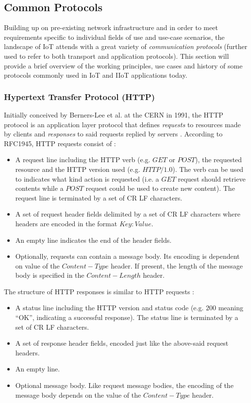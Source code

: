 \subsection{Common Protocols}
\label{sec:iot-common-protocols}
Building up on pre-existing network infrastructure and in order to meet requirements specific to individual fields of use and use-case scenarios, the landscape of \ac{IoT} attends with a great variety of \emph{communication protocols} (further used to refer to both transport and application protocols). This section will provide a brief overview of the working principles, use cases and history of some protocols commonly used in \ac{IoT} and \ac{IIoT} applications today.
\subsubsection{Hypertext Transfer Protocol (\ac{HTTP})}
Initially conceived by Berners-Lee et al. at the \ac{CERN} in 1991, the \ac{HTTP} protocol is an application layer protocol that defines \emph{requests} to resources made by clients and \emph{responses} to said requests replied by servers \cite{http1991}. According to RFC1945, \ac{HTTP} requests consist of \cite{rfc1945}:
\begin{itemize}
    \item A request line including the \ac{HTTP} verb (e.g. $GET$ or $POST$), the requested resource and the \ac{HTTP} version used (e.g. $HTTP/1.0$). The verb can be used to indicates what kind action is requested (i.e. a $GET$ request should retrieve contents while a $POST$ request could be used to create new content). The request line is terminated by a set of \ac{CR} \ac{LF} characters.
    \item A set of request header fields delimited by a set of \ac{CR} \ac{LF} characters where headers are encoded in the format $Key: Value$.
    \item An empty line indicates the end of the header fields.
    \item Optionally, requests can contain a message body. Its encoding is dependent on value of the $Content-Type$ header. If present, the length of the message body is specified in the $Content-Length$ header.
\end{itemize}
The structure of \ac{HTTP} responses is similar to \ac{HTTP} requests \cite{rfc1945}:
\begin{itemize}
    \item A status line including the \ac{HTTP} version and status code (e.g. $200$ meaning \enquote{OK}, indicating a successful response). The status line is terminated by a set of \ac{CR} \ac{LF} characters.
    \item A set of response header fields, encoded just like the above-said request headers.
    \item An empty line.
    \item Optional message body. Like request message bodies, the encoding of the message body depends on the value of the $Content-Type$ header.
\end{itemize}
